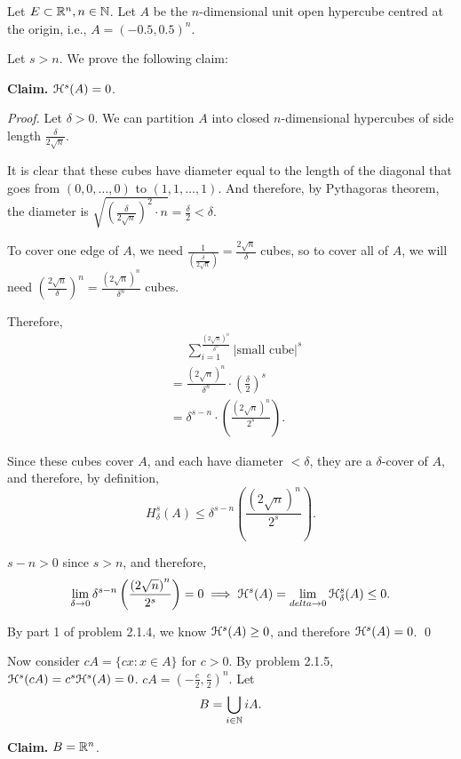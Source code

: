 Let \(E \subset \mathbb{R}^n, n \in \mathbb{N}\). Let \(A\) be the \(n\)-dimensional unit open hypercube centred at the origin, i.e., \(A = (-0.5, 0.5)^n\).

Let \(s > n\). We prove the following claim:

\textbf{Claim.} \(\mathcal{H}^s(A) = 0\).

\textit{Proof.} Let \(\delta > 0.\) We can partition \(A\) into closed \(n\)-dimensional hypercubes of side length \(\frac{\delta}{2\sqrt{n}}\).

It is clear that these cubes have diameter equal to the length of the diagonal that goes from \((0, 0, \ldots, 0)\) to \((1, 1, \ldots, 1)\). And therefore, by Pythagoras theorem, the diameter is \(\sqrt{\left(\frac{\delta}{2\sqrt{n}}\right)^2 \cdot n} = \frac{\delta}{2} < \delta\).

To cover one edge of \(A\), we need \(\frac{1}{\left(\frac{\delta}{2\sqrt{n}}\right)} = \frac{2\sqrt{n}}{\delta}\) cubes, so to cover all of \(A\), we will need \(\left(\frac{2\sqrt{n}}{\delta}\right)^n = \frac{\left(2\sqrt{n}\right)^n}{\delta^n}\) cubes.

Therefore,
\begin{align*}
    &\phantom{=} \sum_{i = 1}^{\frac{\left(2\sqrt{n}\right)^n}{\delta^n}} | \text{small cube}|^s\\
    &= \frac{\left(2\sqrt{n}\right)^n}{\delta^n} \cdot \left(\frac{\delta}{2}\right)^s\\
    &= \delta^{s - n} \cdot \left(\frac{\left(2\sqrt{n}\right)^n}{2^s}\right).
\end{align*}

Since these cubes cover \(A\), and each have diameter \(< \delta\), they are a \(\delta\)-cover of \(A\), and therefore, by definition,
\[
H_\delta^s(A) \leq \delta^{s - n}\left(\frac{\left(2\sqrt{n}\right)^n}{2^s}\right).
\]

\(s - n > 0\) since \(s > n\), and therefore, 
\[
\lim_{\delta \to 0} \delta^{s - n} \left(\frac{\left(2\sqrt{n}\right)^n}{2^s}\right) = 0 \implies \mathcal{H}^s(A) = \lim_{delta \to 0} \mathcal{H}_{\delta}^s(A) \leq 0.
\]

By part 1 of problem 2.1.4, we know \(\mathcal{H}^s(A) \geq 0\), and therefore \(\mathcal{H}^s(A) = 0\). \qed

Now consider \(cA = \{cx : x \in A\}\) for \(c > 0\). By problem 2.1.5, \(\mathcal{H}^s(cA) = c^s \mathcal{H}^s(A) = 0\). \(cA = \left(-\frac{c}{2}, \frac{c}{2}\right)^n\). Let
\[
B = \bigcup_{i \in \mathbb{N}} iA.
\]

\textbf{Claim.} \(B = \mathbb{R}^n\).


